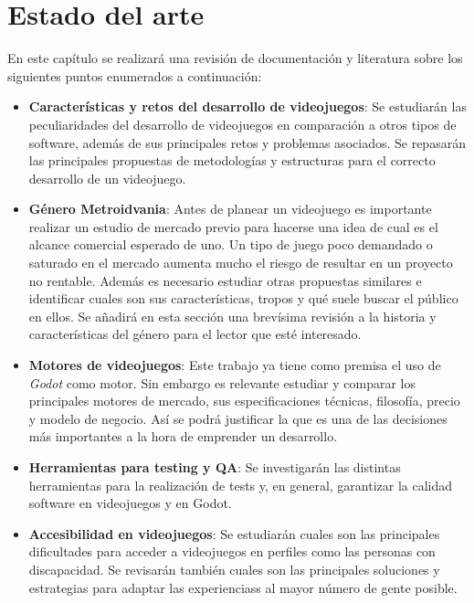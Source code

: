 \chapter{Estado del arte}

En este capítulo se realizará una revisión de documentación y literatura sobre los siguientes puntos enumerados a continuación:

\begin{itemize}

    \item \textbf{Características y retos del desarrollo de videojuegos}: Se estudiarán las peculiaridades del desarrollo de videojuegos en comparación a otros tipos de software, además de sus principales retos y problemas asociados. Se repasarán las principales propuestas de metodologías y estructuras para el correcto desarrollo de un videojuego.
    
    \item \textbf{Género Metroidvania}: Antes de planear un videojuego es importante realizar un estudio de mercado previo para hacerse una idea de cual es el alcance comercial esperado de uno. Un tipo de juego poco demandado o saturado en el mercado aumenta mucho el riesgo de resultar en un proyecto no rentable. Además es necesario estudiar otras propuestas similares e identificar cuales son sus características, tropos y qué suele buscar el público en ellos. Se añadirá en esta sección una brevísima revisión a la historia y características del género para el lector que esté interesado.

    \item \textbf{Motores de videojuegos}: Este trabajo ya tiene como premisa el uso de \textit{Godot} como motor. Sin embargo es relevante estudiar y comparar los principales motores de mercado, sus especificaciones técnicas, filosofía, precio y modelo de negocio. Así se podrá justificar la que es una de las decisiones más importantes a la hora de emprender un desarrollo.
    
    \item \textbf{Herramientas para testing y QA}: Se investigarán las distintas herramientas para la realización de tests y, en general, garantizar la calidad software en videojuegos y en Godot.
    
    \item \textbf{Accesibilidad en videojuegos}: Se estudiarán cuales son las principales dificultades para acceder a videojuegos en perfiles como las personas con discapacidad. Se revisarán también cuales son las principales soluciones y estrategias para adaptar las experienciass al mayor número de gente posible.

\end{itemize} 

